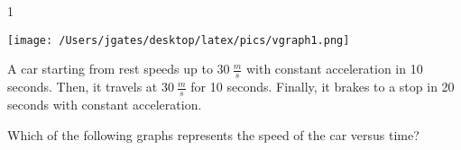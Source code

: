 
\AddToShipoutPicture*{\BackgroundPic}

\addtocounter {ProbNum} {1}

\begin{floatingfigure}[r]{.3\textwidth}
\texttt{[image: /Users/jgates/desktop/latex/pics/vgraph1.png]}
\end{floatingfigure}
 
{\bf \Large{}} A car starting from rest speeds up to ${30~\frac{m}{s}}$ with constant acceleration in 10 seconds. Then, it travels at ${30~\frac{m}{s}}$ for 10 seconds. Finally, it brakes to a stop in 20 seconds with constant acceleration. 
\bigskip

\indent Which of the following graphs represents the speed of the car versus time?  
 

\vfill

\newpage
